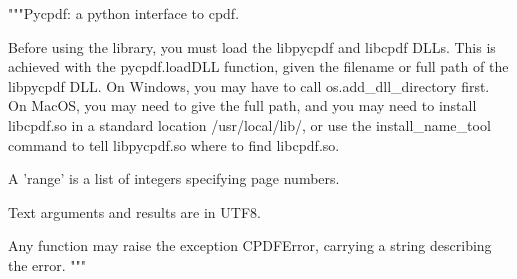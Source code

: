 """Pycpdf: a python interface to cpdf.

Before using the library, you must load the libpycpdf and libcpdf DLLs. This is
achieved with the pycpdf.loadDLL function, given the filename or full path of
the libpycpdf DLL.  On Windows, you may have to call os.add_dll_directory
first. On MacOS, you may need to give the full path, and you may need to
install libcpdf.so in a standard location /usr/local/lib/, or use the
install_name_tool command to tell libpycpdf.so where to find libcpdf.so.

A 'range' is a list of integers specifying page numbers.

Text arguments and results are in UTF8.

Any function may raise the exception CPDFError, carrying a string describing
the error.
"""
